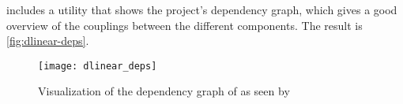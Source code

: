 

\bazel includes a utility that shows the project's dependency graph, which gives a good overview of the couplings between the different components.
The result is \autoref{fig:dlinear-deps}.

\begin{figure}[h]
    \centering
    \texttt{[image: dlinear\_deps]}
    \caption{Visualization of the dependency graph of \dlinear as seen by \bazel}\label{fig:dlinear-deps}
\end{figure}
